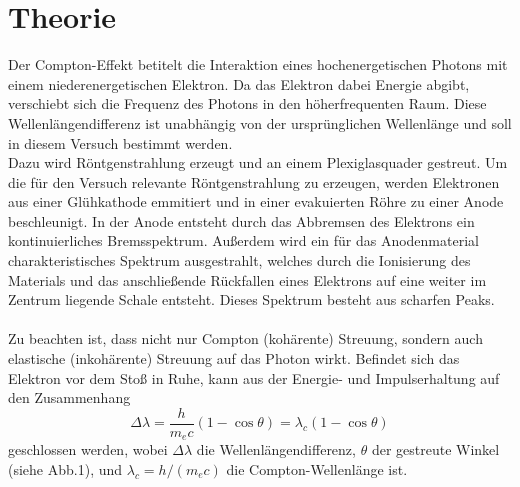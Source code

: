 \section{Theorie}
\label{sec:Theorie}
    Der Compton-Effekt betitelt die Interaktion eines hochenergetischen Photons mit einem 
    niederenergetischen Elektron. Da das Elektron dabei Energie abgibt, verschiebt sich 
    die Frequenz des Photons in den höherfrequenten Raum. Diese Wellenlängendifferenz
    ist unabhängig von der ursprünglichen Wellenlänge und soll in diesem Versuch bestimmt 
    werden.\\
    Dazu wird Röntgenstrahlung erzeugt und an einem Plexiglasquader gestreut. Um die für 
    den Versuch relevante Röntgenstrahlung zu erzeugen, werden Elektronen aus einer 
    Glühkathode emmitiert und in einer evakuierten Röhre zu einer Anode beschleunigt. In der Anode
    entsteht durch das Abbremsen des Elektrons ein kontinuierliches Bremsspektrum. Außerdem 
    wird ein für das Anodenmaterial charakteristisches Spektrum ausgestrahlt, welches durch die 
    Ionisierung des Materials und das anschließende Rückfallen eines Elektrons auf eine weiter im 
    Zentrum liegende Schale entsteht. Dieses Spektrum besteht aus scharfen Peaks. \\
    \\
    Zu beachten ist, dass nicht nur Compton (kohärente) Streuung, sondern auch
    elastische (inkohärente) Streuung auf das Photon wirkt. Befindet sich das Elektron 
    vor dem Stoß in Ruhe, kann aus der Energie- und Impulserhaltung auf den Zusammenhang
    \begin{equation*}
        \Delta \lambda = \dfrac{h}{m_e c}(1-\cos{\theta})=\lambda_c(1-\cos{\theta})
    \end{equation*}
    geschlossen werden, wobei $\Delta \lambda$ die Wellenlängendifferenz, $\theta$ der 
    gestreute Winkel (siehe Abb.1), und $\lambda_c=h/(m_e c)$ die Compton-Wellenlänge ist.\\
    

